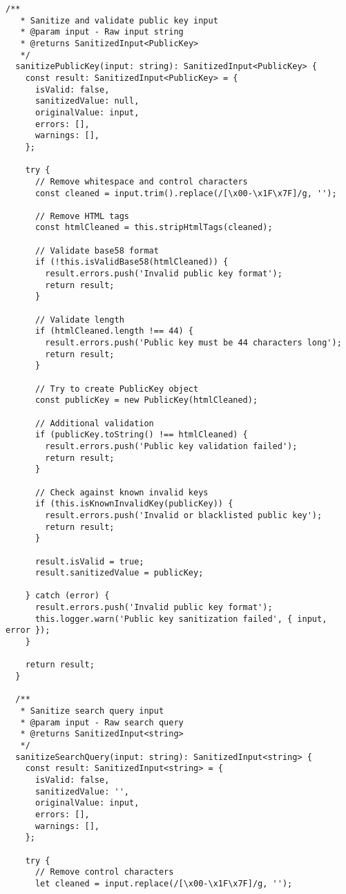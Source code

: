 \documentclass[11pt,a4paper]{article}
\begin{document}
\begin{lstlisting}[style=typescript, caption=Comprehensive Input Sanitization]
  /**
   * Sanitize and validate public key input
   * @param input - Raw input string
   * @returns SanitizedInput<PublicKey>
   */
  sanitizePublicKey(input: string): SanitizedInput<PublicKey> {
    const result: SanitizedInput<PublicKey> = {
      isValid: false,
      sanitizedValue: null,
      originalValue: input,
      errors: [],
      warnings: [],
    };

    try {
      // Remove whitespace and control characters
      const cleaned = input.trim().replace(/[\x00-\x1F\x7F]/g, '');
      
      // Remove HTML tags
      const htmlCleaned = this.stripHtmlTags(cleaned);
      
      // Validate base58 format
      if (!this.isValidBase58(htmlCleaned)) {
        result.errors.push('Invalid public key format');
        return result;
      }

      // Validate length
      if (htmlCleaned.length !== 44) {
        result.errors.push('Public key must be 44 characters long');
        return result;
      }

      // Try to create PublicKey object
      const publicKey = new PublicKey(htmlCleaned);
      
      // Additional validation
      if (publicKey.toString() !== htmlCleaned) {
        result.errors.push('Public key validation failed');
        return result;
      }

      // Check against known invalid keys
      if (this.isKnownInvalidKey(publicKey)) {
        result.errors.push('Invalid or blacklisted public key');
        return result;
      }

      result.isValid = true;
      result.sanitizedValue = publicKey;

    } catch (error) {
      result.errors.push('Invalid public key format');
      this.logger.warn('Public key sanitization failed', { input, error });
    }

    return result;
  }

  /**
   * Sanitize search query input
   * @param input - Raw search query
   * @returns SanitizedInput<string>
   */
  sanitizeSearchQuery(input: string): SanitizedInput<string> {
    const result: SanitizedInput<string> = {
      isValid: false,
      sanitizedValue: '',
      originalValue: input,
      errors: [],
      warnings: [],
    };

    try {
      // Remove control characters
      let cleaned = input.replace(/[\x00-\x1F\x7F]/g, '');
      

\end{lstlisting}
\end{document}

